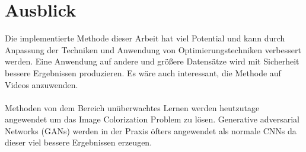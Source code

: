 \section{Ausblick}
Die implementierte Methode dieser Arbeit hat viel Potential und kann durch Anpassung der Techniken und Anwendung von Optimierungstechniken
verbessert werden. Eine Anwendung auf andere und größere Datensätze wird mit Sicherheit bessere Ergebnissen produzieren. Es wäre auch interessant, 
die Methode auf Videos anzuwenden. 
\\
\\
Methoden von dem Bereich unüberwachtes Lernen werden heutzutage angewendet um das Image Colorization Problem zu lösen. Generative adversarial
Networks (GANs) werden in der Praxis öfters angewendet als normale \gls{CNN}s da dieser viel bessere Ergebnissen erzeugen.